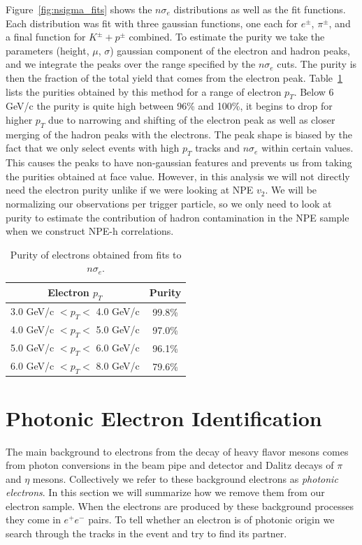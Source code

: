 Figure~\ref{fig:nsigma_fits} shows the $n\sigma_e$ distributions as well as the fit functions. Each distribution was fit with three gaussian functions, one each for $e^{\pm}$, $\pi^{\pm}$, and a final function for $K^{\pm} + p^{\pm}$ combined. To estimate the purity we take the parameters (height, $\mu$, $\sigma$) gaussian component of the electron and hadron peaks, and we integrate the peaks over the range specified by the $n\sigma_e$ cuts. The purity is then the fraction of the total yield that comes from the electron peak. Table~\ref{tab:purity} lists the purities obtained by this method for a range of electron $p_T$. Below 6 GeV/c the purity is quite high between 96\% and 100\%, it begins to drop for higher $p_T$ due to narrowing and shifting of the electron peak as well as closer merging of the hadron peaks with the electrons. The peak shape is biased by the fact that we only select events with high $p_T$ tracks and $n\sigma_e$ within certain values. This causes the peaks to have non-gaussian features and prevents us from taking the purities obtained at face value. However, in this analysis we will not directly need the electron purity unlike if we were looking at NPE $v_2$. We will be normalizing our observations per trigger particle, so we only need to look at purity to estimate the contribution of hadron contamination in the NPE sample when we construct NPE-h correlations.  

\begin{table}
\centering
\begin{tabular}{|c|c|}
\hline
Electron $p_T$         & Purity \\
\hline
3.0 GeV/c $< p_T <$ 4.0 GeV/c   & 99.8\% \\
\hline
4.0 GeV/c $< p_T <$ 5.0 GeV/c   & 97.0\% \\
\hline
5.0 GeV/c $< p_T <$ 6.0 GeV/c   & 96.1\% \\
\hline
6.0 GeV/c $< p_T <$ 8.0 GeV/c   & 79.6\% \\
\hline
\end{tabular}
\caption[Electron Purity]{Purity of electrons obtained from fits to $n\sigma_e$.}
\label{tab:purity}
\end{table}

\section{Photonic Electron Identification}

The main background to electrons from the decay of heavy flavor mesons comes from photon conversions in the beam pipe and detector and Dalitz decays of $\pi$ and $\eta$ mesons. Collectively we refer to these background electrons as \textit{photonic electrons}. In this section we will summarize how we remove them from our electron sample. When the electrons are produced by these background processes they come in $e^{+}e^{-}$ pairs. To tell whether an electron is of photonic origin we search through the tracks in the event and try to find its partner.

